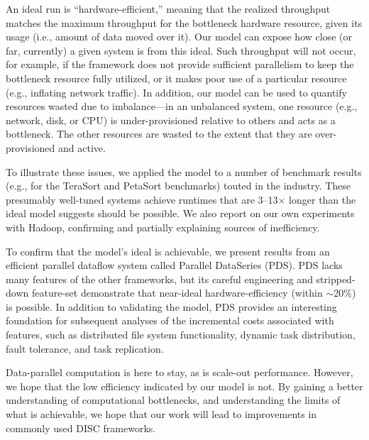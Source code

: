 An ideal run is ``hardware-efficient,'' meaning that the realized
throughput matches the maximum throughput for the bottleneck hardware
resource, given its usage (i.e., amount of data moved over it).  Our
model can expose how close (or far, currently) a given system is from
this ideal.  Such throughput will not occur, for example, if the
framework does not provide sufficient parallelism to keep the
bottleneck resource fully utilized, or it makes poor use of a
particular resource (e.g., inflating network traffic).  In addition,
our model can be used to quantify resources wasted due to
imbalance---in an unbalanced system, one resource (e.g., network,
disk, or CPU) is under-provisioned relative to others and acts as a
bottleneck.  The other resources are wasted to the extent that they
are over-provisioned and active.

To illustrate these issues, we applied the model to a number of
benchmark results (e.g., for the TeraSort and PetaSort benchmarks)
touted in the industry.  These presumably well-tuned systems achieve
runtimes that are 3--13$\times$ longer than the ideal model suggests
should be possible.  We also report on our own experiments with
Hadoop, confirming and partially explaining sources of inefficiency.

To confirm that the model's ideal is achievable, we present results from
an efficient parallel dataflow system called Parallel DataSeries (PDS).
PDS lacks many features of the other frameworks, but its careful
engineering and stripped-down feature-set demonstrate that
near-ideal hardware-efficiency (within $\sim$20\%) is possible.
In addition to validating the model, PDS provides an interesting
foundation for subsequent analyses of the incremental costs associated
with features, such as distributed file system functionality,
dynamic task distribution, fault tolerance, and task replication.


Data-parallel computation is here to stay, as is scale-out
performance.  However, we hope that the low efficiency indicated by
our model is not.  By gaining a better understanding of computational
bottlenecks, and understanding the limits of what is achievable, we
hope that our work will lead to improvements in commonly used DISC
frameworks.



